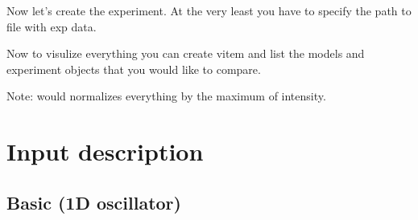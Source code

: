 \documentclass[letterpaper,10pt,english]{sphinxmanual}
\begin{document}
\begin{sphinxVerbatim}[commandchars=\\\{\}]
\end{sphinxVerbatim}

Now let’s create the experiment. At the very least you have to specify the  path to file  with exp data.

\begin{sphinxVerbatim}[commandchars=\\\{\}]
      
\end{sphinxVerbatim}

Now to visulize everything you can create vitem and list the models and experiment objects that you would like to compare.

\begin{sphinxVerbatim}[commandchars=\\\{\}]
    \PYG{p}{[}\PYG{p}{]}   
\end{sphinxVerbatim}

Note:   would normalizes everything by the maximum of intensity.

\begin{sphinxVerbatim}[commandchars=\\\{\}]
  
\end{sphinxVerbatim}



\chapter{Input description}
\label{\detokenize{input:input-description}}\label{\detokenize{input::doc}}

\section{Basic (1D oscillator)}
\label{\detokenize{input:basic-1d-oscillator}}
\end{document}
